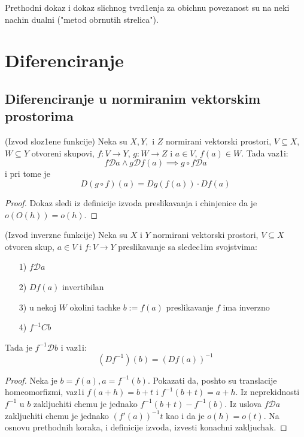 \documentclass[a4paper,12pt]{article}
\newcommand{\psj}{\subseteq}
\begin{document}
\begin{nap}
Prethodni dokaz i dokaz slichnog tvrd1enja za obichnu povezanost su na neki nachin dualni ("metod obrnutih strelica").
\end{nap}

\section{Diferenciranje}
\subsection{Diferenciranje u normiranim vektorskim prostorima}

\begin{tma}(Izvod sloz1ene funkcije)
Neka su $X, Y,$ i $Z$ normirani vektorski prostori, $V \psj X$, $W \psj Y$ otvoreni skupovi, $f: V \to Y$, $g: W \to Z$ i $a \in V$, $f(a) \in W$. Tada vaz1i:
\[f\mathcal{D} a \wedge g \mathcal{D} f(a) \implies g\circ f \mathcal{D} a\]
i pri tome je
\[D(g \circ f) (a) = Dg(f(a))\cdot Df(a) \]
\end{tma}
\begin{proof}
Dokaz sledi iz definicije izvoda preslikavanja i chinjenice da je $o(O(h)) = o(h)$.
\end{proof}

\begin{tma}(Izvod inverzne funkcije)
Neka su $X$ i $Y$ normirani vektorski prostori, $V \psj X$ otvoren skup, $a\in V$ i $f: V \to Y$ preslikavanje sa sledec1im svojstvima:
\begin{itemize}
\item[1)] $f \mathcal{D} a$
\item[2)] $Df(a)$ invertibilan
\item[3)] u nekoj $W$ okolini tachke $b := f(a)$ preslikavanje $f$ ima inverzno
\item[4)] $f^{-1} C b$
\end{itemize}
Tada je $f^{-1} \mathcal{D} b$ i vaz1i:
\[(Df^{-1})(b) = {(Df(a))}^{-1}\]
\end{tma}
\begin{proof}
Neka je $b = f(a), a = f^{-1}(b)$. Pokazati da, poshto su translacije homeomorfizmi, vaz1i $f(a+h) = b+t$ i $f^{-1}(b+t) = a+h$. Iz neprekidnosti $f^{-1}$ u $b$ zakljuchiti chemu je jednako $f^{-1} (b+t) - f^{-1}(b)$. Iz uslova $f \mathcal{D} a$ zakljuchiti chemu je jednako ${(f'(a))}^{-1} t$ kao i da je $o(h) = o(t)$. Na osnovu prethodnih koraka, i definicije izvoda, izvesti konachni zakljuchak.
\end{proof}
\end{document}
